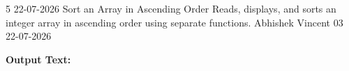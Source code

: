 \clearpage
\label{prog:05}
\programhead
  {5}
  {22-07-2026}
  {Sort an Array in Ascending Order}
  {Reads, displays, and sorts an integer array in ascending order using separate functions.}
  {Abhishek Vincent}
  {03}
  {22-07-2026}

\divider
\textbf{Output Text:}\par
\vspace{2pt}

